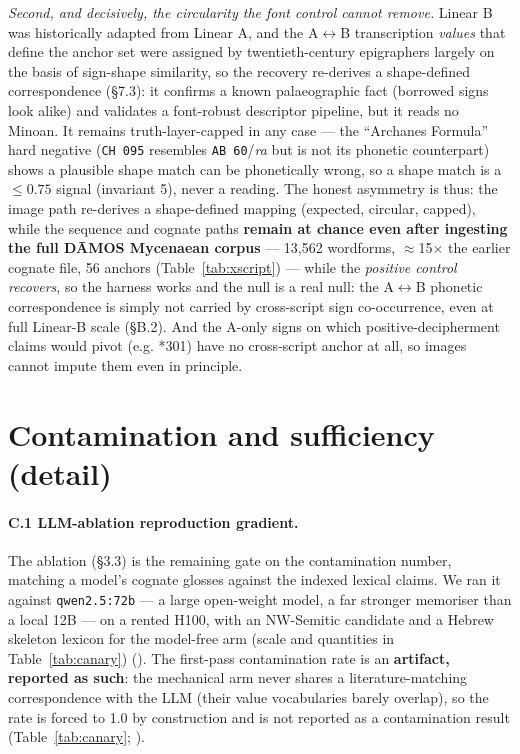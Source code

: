 \emph{Second, and decisively, the circularity the font control cannot
remove.} Linear B was historically adapted from Linear A, and the
A$\leftrightarrow$B transcription \emph{values} that define the anchor set
were assigned by twentieth-century epigraphers largely on the basis of
sign-shape similarity, so the recovery re-derives a shape-defined
correspondence (\S7.3): it confirms a known palaeographic fact (borrowed
signs look alike) and validates a font-robust descriptor pipeline, but it
reads no Minoan. It remains truth-layer-capped in any case --- the
\citet{ferrara2021} ``Archanes Formula'' hard negative (\texttt{CH 095}
resembles \texttt{AB 60}/\emph{ra} but is not its phonetic counterpart)
shows a plausible shape match can be phonetically wrong, so a shape match is
a $\le 0.75$ signal (invariant 5), never a reading. The honest asymmetry is
thus: the image path re-derives a shape-defined mapping (expected, circular,
capped), while the sequence and cognate paths \textbf{remain at chance even
after ingesting the full D\=AMOS Mycenaean corpus} --- 13,562 wordforms,
$\approx$15$\times$ the earlier cognate file, 56 anchors
(Table~\ref{tab:xscript}) --- while the \emph{positive control
recovers}, so the harness works and the null is a real null: the
A$\leftrightarrow$B phonetic correspondence is simply not carried by
cross-script sign co-occurrence, even at full Linear-B scale
(\S B.2). And the A-only signs on which
positive-decipherment claims would pivot (e.g. *301) have no cross-script
anchor at all, so images cannot impute them even in principle.

\section{Contamination and sufficiency (detail)}

\paragraph{C.1 LLM-ablation reproduction gradient.} The ablation
(\S3.3) is the remaining gate on the contamination number, matching a
model's cognate glosses against the indexed lexical claims. We ran it
against \texttt{qwen2.5:72b} --- a large open-weight model, a far
stronger memoriser than a local 12B --- on a rented H100, with an
NW-Semitic candidate and a Hebrew skeleton lexicon for the model-free arm
(scale and quantities in Table~\ref{tab:canary}) (\artref). The
first-pass contamination rate is an \textbf{artifact, reported as such}:
the mechanical arm never shares a literature-matching correspondence with
the LLM (their value vocabularies barely overlap), so the rate is forced
to 1.0 by construction and is not reported as a contamination result
(Table~\ref{tab:canary}; \artref).


